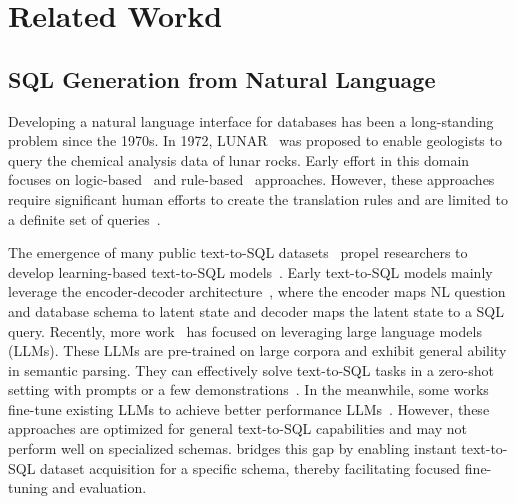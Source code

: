 \section{Related Workd}
\subsection{SQL Generation from Natural Language}



Developing a natural language interface for databases has been a long-standing problem since the 1970s. In 1972,  LUNAR~\cite{lunar} was proposed to enable geologists to query the chemical analysis data of lunar rocks. 
Early effort in this domain focuses on logic-based~\cite{logic1, logic2} and rule-based~\cite{rule1, SQLizer, ATHENA, Semantic-Tractability, construct_interface} approaches. However, these approaches require significant human efforts to create the translation rules and are limited to a definite set of queries~\cite{where-are-we, Semantic-Tractability}.

The emergence of many public text-to-SQL datasets~\cite{spider, wikisql, SQLizer, bird} propel researchers to develop learning-based text-to-SQL models~\cite{smbop, STEPS, ratsql, editsql, picard, sqlova}.
Early text-to-SQL models mainly leverage the encoder-decoder architecture~\cite{lin2020bridging, zhong-etal-2020-grounded, seq2sql}, where the encoder maps NL question and database schema to latent state and decoder maps the latent state to a SQL query. 
Recently, more work~\cite{xiyan, dailsql, distillery} has focused on leveraging large language models (LLMs).
These LLMs are pre-trained on large corpora and exhibit general ability in semantic parsing. 
They can effectively solve text-to-SQL tasks in a zero-shot setting with prompts or a few demonstrations~\cite{thorpe2024dubosqldiverseretrievalaugmentedgeneration, -dialsql}.
In the meanwhile, some works fine-tune existing LLMs to achieve better performance LLMs~\cite{codes, finetune_sql_llm, sqlcoder, NSText2SQL}. However, these approaches are optimized for general text-to-SQL capabilities and may not perform well on specialized schemas. {\tool} bridges this gap by enabling instant text-to-SQL dataset acquisition for a specific schema, thereby facilitating focused fine-tuning and evaluation.


